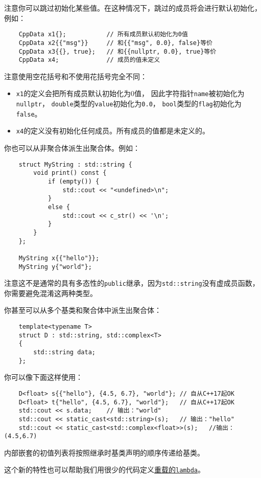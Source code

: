注意你可以跳过初始化某些值。在这种情况下，跳过的成员将会进行默认初始化，例如：
\begin{lstlisting}
    CppData x1{};           // 所有成员默认初始化为0值
    CppData x2{{"msg"}}     // 和{{"msg", 0.0}, false}等价
    CppData x3{{}, true};   // 和{{nullptr, 0.0}, true}等价
    CppData x4;             // 成员的值未定义
\end{lstlisting}
注意使用空花括号和不使用花括号完全不同：
\begin{itemize}[leftmargin=*]
    \item \texttt{x1}的定义会把所有成员默认初始化为0值，
    因此字符指针\texttt{name}被初始化为\texttt{nullptr}，
    \texttt{double}类型的\texttt{value}初始化为\texttt{0.0}，
    \texttt{bool}类型的\texttt{flag}初始化为\texttt{false}。
    \item \texttt{x4}的定义没有初始化任何成员。所有成员的值都是未定义的。
\end{itemize}
你也可以从非聚合体派生出聚合体。例如：
\begin{lstlisting}
    struct MyString : std::string {
        void print() const {
            if (empty()) {
                std::cout << "<undefined>\n";
            }
            else {
                std::cout << c_str() << '\n';
            }
        }
    };

    MyString x{{"hello"}};
    MyString y{"world"};
\end{lstlisting}
注意这不是通常的具有多态性的\texttt{public}继承，因为\texttt{std::string}没有虚成员函数，
你需要避免混淆这两种类型。

你甚至可以从多个基类和聚合体中派生出聚合体：
\begin{lstlisting}
    template<typename T>
    struct D : std::string, std::complex<T>
    {
        std::string data;
    };
\end{lstlisting}
你可以像下面这样使用：
\begin{lstlisting}
    D<float> s{{"hello"}, {4.5, 6.7}, "world"}; // 自从C++17起OK
    D<float> t{"hello", {4.5, 6.7}, "world"};   // 自从C++17起OK
    std::cout << s.data;    // 输出："world"
    std::cout << static_cast<std::string>(s);   // 输出："hello"
    std::cout << static_cast<std::complex<float>>(s);   //输出：(4.5,6.7)
\end{lstlisting}
内部嵌套的初值列表将按照继承时基类声明的顺序传递给基类。

这个新的特性也可以帮助我们用很少的代码定义\hyperref[ch14.1]{重载的\texttt{lambda}}。

